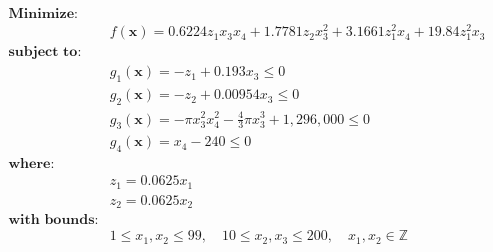 \begin{align*}
\textbf{Minimize:} & \\
& f(\bm{x}) = 0.6224z_1x_3x_4 + 1.7781z_2x_3^2 + 3.1661z_1^2x_4 + 19.84z_1^2x_3 \\[0.5em]
\textbf{subject to:} &\\
& g_1(\bm{x}) = -z_1 + 0.193x_3 \leq 0 \\
& g_2(\bm{x}) = -z_2 + 0.00954x_3 \leq 0 \\
& g_3(\bm{x}) = -\pi x_3^2x_4^2 - \frac{4}{3} \pi x_3^3 + 1,296,000 \leq 0 \\
& g_4(\bm{x}) = x_4 - 240  \leq 0 \\[0.5em]
\textbf{where:} & \\
& z_1 = 0.0625x_1 \\
& z_2 = 0.0625x_2 \\[0.5em]
\textbf{with bounds:} & \\
& 1 \leq x_1, x_2 \leq 99, \quad 10 \leq x_2, x_3 \leq 200, \quad x_1, x_2 \in \mathbb{Z}
\end{align*}